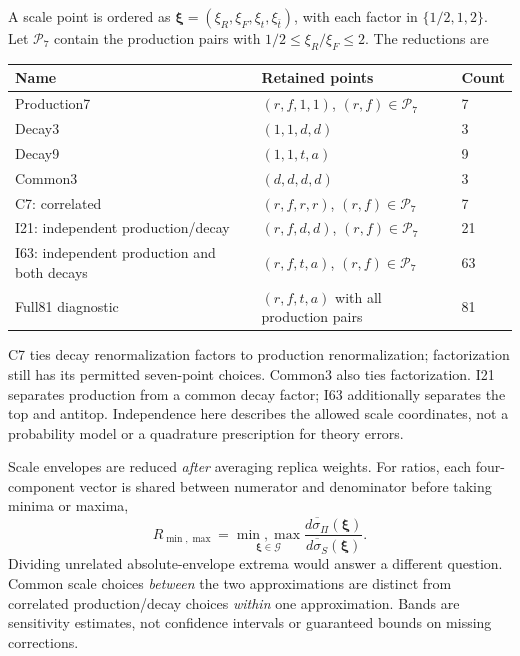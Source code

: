\documentclass[11pt,a4paper]{article}
\begin{document}
A scale point is ordered as
$\boldsymbol\xi=(\xi_R,\xi_F,\xi_t,\xi_{\bar t})$, with each factor
in $\{1/2,1,2\}$. Let $\mathcal P_7$ contain the production pairs with
$1/2\leq\xi_R/\xi_F\leq2$. The reductions are
\begin{center}\small
\begin{tabular}{lll}
\toprule Name & Retained points & Count\\ \midrule
Production7 & $(r,f,1,1)$, $(r,f)\in\mathcal P_7$ & 7\\
Decay3 & $(1,1,d,d)$ & 3\\
Decay9 & $(1,1,t,a)$ & 9\\
Common3 & $(d,d,d,d)$ & 3\\
C7: correlated & $(r,f,r,r)$, $(r,f)\in\mathcal P_7$ & 7\\
I21: independent production/decay & $(r,f,d,d)$, $(r,f)\in\mathcal P_7$ & 21\\
I63: independent production and both decays & $(r,f,t,a)$, $(r,f)\in\mathcal P_7$ & 63\\
Full81 diagnostic & $(r,f,t,a)$ with all production pairs & 81\\
\bottomrule
\end{tabular}
\end{center}
C7 ties decay renormalization factors to production renormalization;
factorization still has its permitted seven-point choices. Common3 also
ties factorization. I21 separates production from a common decay
factor; I63 additionally separates the top and antitop. Independence
here describes the allowed scale coordinates, not a probability model
or a quadrature prescription for theory errors.

Scale envelopes are reduced \emph{after} averaging replica weights.
For ratios, each four-component vector is shared between numerator
and denominator before taking minima or maxima,
\begin{equation}
 R_{\min,\max}=\underset{\boldsymbol\xi\in\mathcal G}{\min,\max}
 \frac{\overline{d\sigma_\Pi}(\boldsymbol\xi)}
 {\overline{d\sigma_S}(\boldsymbol\xi)}.
\end{equation}
Dividing unrelated absolute-envelope extrema would answer a different
question. Common scale choices \emph{between} the two approximations
are distinct from correlated production/decay choices \emph{within}
one approximation. Bands are sensitivity estimates, not confidence
intervals or guaranteed bounds on missing corrections.
\end{document}
